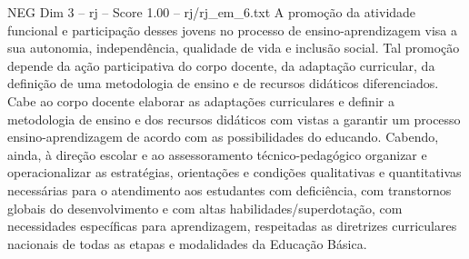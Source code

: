 \begin{textsample}{NEG Dim 3 – rj – Score 1.00 – rj/rj\_em\_6.txt}
A promoção da atividade funcional e participação desses jovens no processo de ensino-aprendizagem visa a sua autonomia, independência, qualidade de vida e inclusão social.
Tal promoção depende da ação participativa do corpo docente, da adaptação curricular, da definição de uma metodologia de ensino e de recursos didáticos diferenciados.
Cabe ao corpo docente elaborar as adaptações curriculares e definir a metodologia de ensino e dos recursos didáticos com vistas a garantir um processo ensino-aprendizagem de acordo com as possibilidades do educando.
Cabendo, ainda, à direção escolar e ao assessoramento técnico-pedagógico organizar e operacionalizar as estratégias, orientações e condições qualitativas e quantitativas necessárias para o atendimento aos estudantes com deficiência, com transtornos globais do desenvolvimento e com altas habilidades/superdotação, com necessidades específicas para aprendizagem, respeitadas as diretrizes curriculares nacionais de todas as etapas e modalidades da Educação Básica.

\end{textsample}

